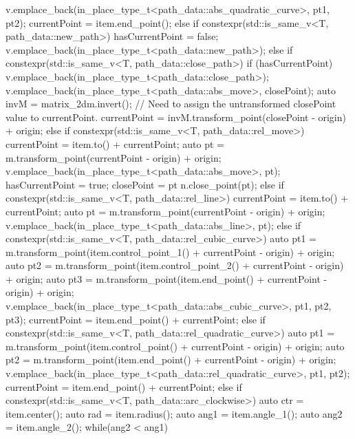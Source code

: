 \begin{codeblock}
{{{{      	}
      	v.emplace_back(in_place_type_t<path_data::abs_quadratic_curve>,
      	  pt1, pt2);
      	currentPoint = item.end_point();
      }
      else if constexpr(std::is_same_v<T, path_data::new_path>) {
        hasCurrentPoint = false;
        v.emplace_back(in_place_type_t<path_data::new_path>);
      }
      else if constexpr(std::is_same_v<T, path_data::close_path>) {
        if (hasCurrentPoint) {
          v.emplace_back(in_place_type_t<path_data::close_path>);
          v.emplace_back(in_place_type_t<path_data::abs_move>,
            closePoint);
          auto invM = matrix_2d{m}.invert();
          // Need to assign the untransformed closePoint value to currentPoint.
          currentPoint = invM.transform_point(closePoint - origin) + origin;
        }
      }
      else if constexpr(std::is_same_v<T, path_data::rel_move>) {
        currentPoint = item.to() + currentPoint;
        auto pt = m.transform_point(currentPoint - origin) + origin;
        v.emplace_back(in_place_type_t<path_data::abs_move>, pt);
        hasCurrentPoint = true;
        closePoint = pt    
        n.close_point(pt);
      }
      else if constexpr(std::is_same_v<T, path_data::rel_line>) {
        currentPoint = item.to() + currentPoint;
        auto pt = m.transform_point(currentPoint - origin) + origin;
        v.emplace_back(in_place_type_t<path_data::abs_line>, pt);
      }
      else if constexpr(std::is_same_v<T, path_data::rel_cubic_curve>) {
        auto pt1 = m.transform_point(item.control_point_1() + currentPoint -
        origin) + origin;
        auto pt2 = m.transform_point(item.control_point_2() + currentPoint -
        origin) + origin;
        auto pt3 = m.transform_point(item.end_point() + currentPoint - origin) +
          origin;
        v.emplace_back(in_place_type_t<path_data::abs_cubic_curve>,
          pt1, pt2, pt3);
        currentPoint = item.end_point() + currentPoint;
      }
      else if constexpr(std::is_same_v<T,
      path_data::rel_quadratic_curve>) {
      	auto pt1 = m.transform_point(item.control_point() + currentPoint -
      	  origin) + origin;
      	auto pt2 = m.transform_point(item.end_point() + currentPoint -
      	  origin) + origin;
      	v.emplace_back(in_place_type_t<path_data::rel_quadratic_curve>,
      	pt1, pt2);
      	currentPoint = item.end_point() + currentPoint;
      }
      else if constexpr(std::is_same_v<T, path_data::arc_clockwise>) {
        auto ctr = item.center();
        auto rad = item.radius();
        auto ang1 = item.angle_1();
        auto ang2 = item.angle_2();
        while(ang2 < ang1) {
}}}}
\end{codeblock}
